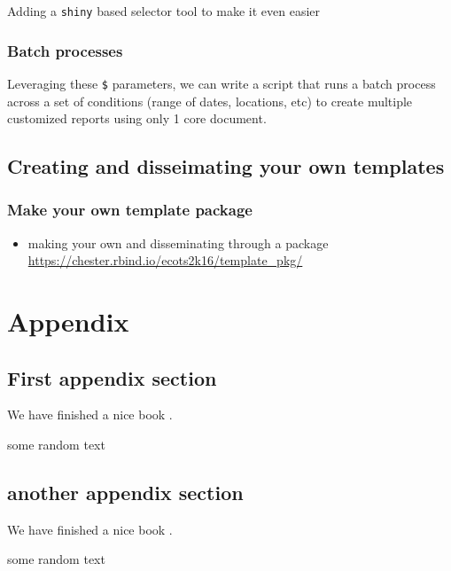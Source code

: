 \documentclass[
]{book}
\providecommand{\tightlist}{%
  \setlength{\itemsep}{0pt}\setlength{\parskip}{0pt}}
\begin{document}
Adding a \texttt{shiny} based selector tool to make it even easier

\hypertarget{batch-processes}{%
\section{Batch processes}\label{batch-processes}}

Leveraging these \texttt{\$} parameters, we can write a script that runs a batch process across a set of conditions (range of dates, locations, etc) to create multiple customized reports using only 1 core document.

\hypertarget{template}{%
\chapter{Creating and disseimating your own templates}\label{template}}

\hypertarget{make-your-own-template-package}{%
\section{Make your own template package}\label{make-your-own-template-package}}

\begin{itemize}
\tightlist
\item
  making your own and disseminating through a package \url{https://chester.rbind.io/ecots2k16/template_pkg/}
\end{itemize}

\hypertarget{part-appendix}{%
\part{Appendix}\label{part-appendix}}

\hypertarget{appendix-appendix}{%
\appendix}


\hypertarget{first-appendix-section}{%
\chapter{First appendix section}\label{first-appendix-section}}

We have finished a nice book .

some random  text

\hypertarget{another-appendix-section}{%
\chapter{another appendix section}\label{another-appendix-section}}

We have finished a nice book .

some random  text

  

\printindex
\end{document}
